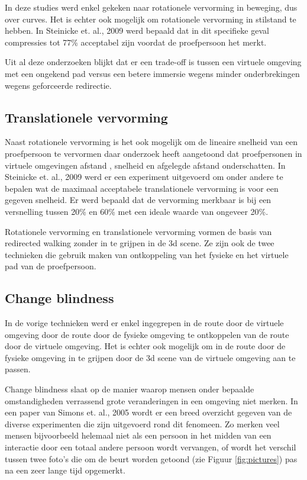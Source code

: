 In deze studies werd enkel gekeken naar rotationele vervorming in beweging, dus 
over curves. Het is echter ook mogelijk om rotationele vervorming in stilstand te
hebben. In Steinicke et. al., 2009 \cite{steinicke09} werd bepaald dat in dit 
specifieke geval compressies tot 77\% acceptabel zijn voordat de proefpersoon het 
merkt.

Uit al deze onderzoeken blijkt dat er een trade-off is tussen een virtuele 
omgeving met een ongekend pad\cite{neth12} versus een betere immersie wegens 
minder onderbrekingen wegens geforceerde redirectie\cite{engel08,kohn01}.


\subsection{Translationele vervorming} \label{1:trans}
Naast rotationele vervorming is het ook mogelijk om de lineaire snelheid van een
proefpersoon te vervormen daar onderzoek heeft aangetoond dat proefpersonen in 
virtuele omgevingen afstand \cite{loomis03}, snelheid \cite{banton05} en 
afgelegde afstand \cite{frenz07} onderschatten. In Steinicke et. al., 2009 \cite{steinicke09} 
werd er een experiment uitgevoerd om onder andere te bepalen wat de maximaal 
acceptabele translationele vervorming is voor een gegeven snelheid. Er werd 
bepaald dat de vervorming merkbaar is bij een versnelling tussen 20\% en 60\% 
met een ideale waarde van ongeveer 20\%.

Rotationele vervorming en translationele vervorming vormen de basis van
redirected walking zonder in te grijpen in de 3d scene. Ze zijn ook de twee 
technieken die gebruik maken van ontkoppeling van het fysieke en het virtuele 
pad van de proefpersoon.


\subsection{Change blindness} \label{1:blindness}
In de vorige technieken werd er enkel ingegrepen in de route door de virtuele
omgeving door de route door de fysieke omgeving te ontkoppelen van de route door
de virtuele omgeving. Het is echter ook mogelijk om in de route door de fysieke
omgeving in te grijpen door de 3d scene van de virtuele omgeving aan te passen.

Change blindness slaat op de manier waarop mensen onder bepaalde omstandigheden
verrassend grote veranderingen in een omgeving niet merken. In een paper van
Simons et. al., 2005 \cite{simons05} wordt er een breed overzicht gegeven van de
diverse experimenten die zijn uitgevoerd rond dit fenomeen. Zo merken veel mensen
bijvoorbeeld helemaal niet als een persoon in het midden van een interactie door
een totaal andere persoon wordt vervangen\cite{simons98}, of wordt het verschil
tussen twee foto's die om de beurt worden getoond (zie Figuur \ref{fig:pictures})
pas na een zeer lange tijd opgemerkt\cite{rensink97}.

